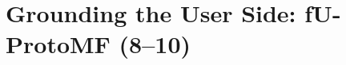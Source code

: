 \chapter{Grounding the User Side: fU-ProtoMF (8--10)}   %
\label{ch:fu}
\label{sec:fu-info-ordering}   %

